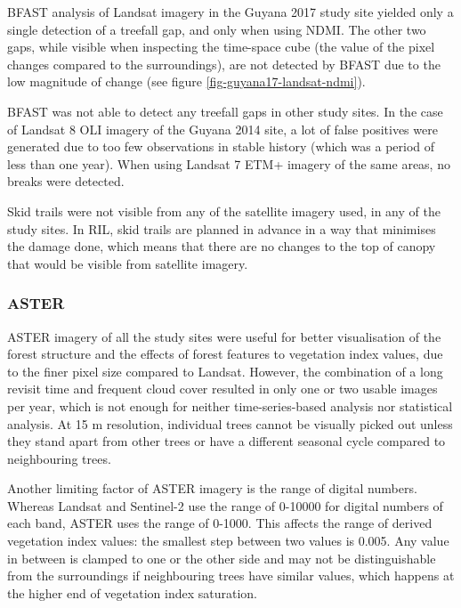 \documentclass[a4paper,12pt]{scrbook}
\begin{document}
\ac{BFAST} analysis of Landsat imagery in the Guyana 2017 study site yielded only a single detection of a treefall gap, and only when using \ac{NDMI}. The other two gaps, while visible when inspecting the time-space cube (the value of the pixel changes compared to the surroundings), are not detected by \ac{BFAST} due to the low magnitude of change (see figure \ref{fig-guyana17-landsat-ndmi}).

\ac{BFAST} was not able to detect any treefall gaps in other study sites. In the case of Landsat 8 \ac{OLI} imagery of the Guyana 2014 site, a lot of false positives were generated due to too few observations in stable history (which was a period of less than one year). When using Landsat 7 \ac{ETM+} imagery of the same areas, no breaks were detected.

Skid trails were not visible from any of the satellite imagery used, in any of the study sites. In \ac{RIL}, skid trails are planned in advance in a way that minimises the damage done, which means that there are no changes to the top of canopy that would be visible from satellite imagery.


\subsubsection{ASTER}

\ac{ASTER} imagery of all the study sites were useful for better visualisation of the forest structure and the effects of forest features to vegetation index values, due to the finer pixel size compared to Landsat. However, the combination of a long revisit time and frequent cloud cover resulted in only one or two usable images per year, which is not enough for neither time-series-based analysis nor statistical analysis. At 15 m resolution, individual trees cannot be visually picked out unless they stand apart from other trees or have a different seasonal cycle compared to neighbouring trees.

Another limiting factor of \ac{ASTER} imagery is the range of digital numbers. Whereas Landsat and Sentinel-2 use the range of 0-10000 for digital numbers of each band, \ac{ASTER} uses the range of 0-1000. This affects the range of derived vegetation index values: the smallest step between two values is 0.005. Any value in between is clamped to one or the other side and may not be distinguishable from the surroundings if neighbouring trees have similar values, which happens at the higher end of vegetation index saturation.
\end{document}
